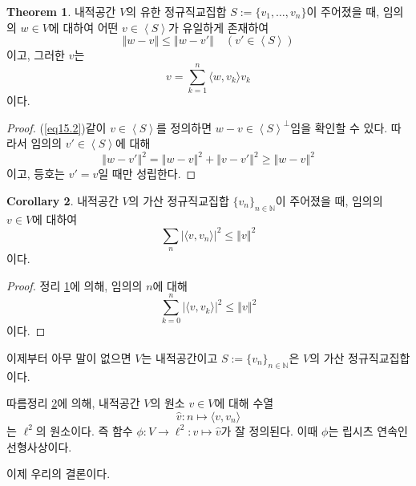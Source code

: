 \documentclass[11pt]{book}
\numberwithin{equation}{chapter}
\def\NN{\mathbb{N}}
\newcommand{\inner}[2]{\langle#1, #2\rangle}
\newcommand{\abs}[1]{\left\vert#1\right\vert}
\newcommand{\norm}[1]{\left\Vert#1\right\Vert}
\newcommand{\gen}[1]{\left\langle#1\right\rangle}
\theoremstyle{definition}
\newtheorem{thm}{Theorem}[section]
\newtheorem{cor}[thm]{Corollary}
\begin{document}
\begin{thm} \label{15.1.4}
    내적공간 \(V\)의 유한 정규직교집합 \(S := \{v_1, \ldots, v_n\}\)이 주어졌을 때, 임의의 \(w \in V\)에 대하여 어떤 \(v \in \gen{S}\)가 유일하게 존재하여
    \begin{equation} \label{eq15.1}
        \norm{w - v} \le \norm{w - v'} \quad (v' \in \gen{S})
    \end{equation}
    이고, 그러한 \(v\)는
    \begin{equation} \label{eq15.2}
        v = \sum_{k=1}^n \inner{w}{v_k} v_k
    \end{equation}
    이다.
\end{thm}
\begin{proof}
    (\ref{eq15.2})\와 같이 \(v \in \gen{S}\)를 정의하면 \(w - v \in \gen{S}^\perp\)임을 확인할 수 있다. 따라서 임의의 \(v' \in \gen{S}\)에 대해
    \[
        \norm{w - v'}^2 = \norm{w - v}^2 + \norm{v - v'}^2 \ge \norm{w - v}^2
    \]
    이고, 등호는 \(v' = v\)일 때만 성립한다.
\end{proof}

\begin{cor} \label{15.1.5}
    내적공간 \(V\)의 가산 정규직교집합 \(\{v_n\}_{n \in \NN}\)이 주어졌을 때, 임의의 \(v \in V\)에 대하여
    \[
        \sum_n \abs{\inner{v}{v_n}}^2 \le \norm{v}^2
    \]
    이다.
\end{cor}
\begin{proof}
    정리 \ref{15.1.4}에 의해, 임의의 \(n\)에 대해
    \[
        \sum_{k=0}^n \abs{\inner{v}{v_k}}^2 \le \norm{v}^2
    \]
    이다.
\end{proof}

이제부터 아무 말이 없으면 \(V\)는 내적공간이고 \(S := \{v_n\}_{n \in \NN}\)은 \(V\)의 가산 정규직교집합이다.

따름정리 \ref{15.1.5}에 의해, 내적공간 \(V\)의 원소 \(v \in V\)에 대해 수열
    \[
        \hat{v} : n \mapsto \inner{v}{v_n}
    \]
는 \(\ell^2\)의 원소이다. 즉 함수 \(\phi : V \to \ell^2 : v \mapsto \hat{v}\)가 잘 정의된다. 이때 \(\phi\)는 립시츠 연속인 선형사상이다.

이제 우리의 결론이다.
\end{document}
